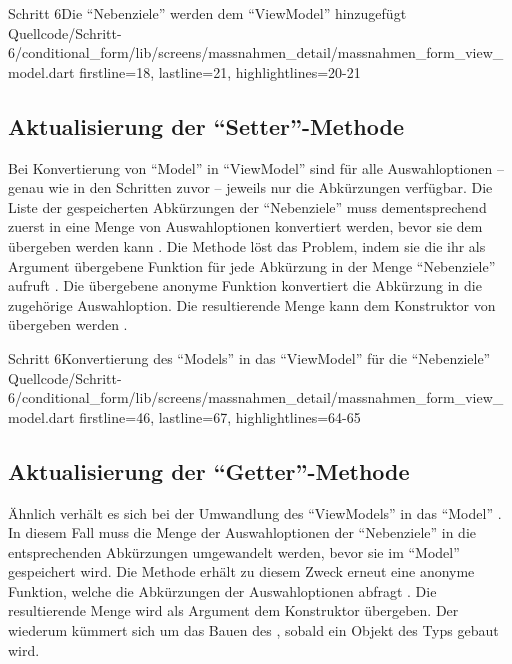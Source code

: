 \begin{alexlisting}{Schritt 6}{Die \enquote{Nebenziele} werden dem \enquote{ViewModel} hinzugefügt}
  {Quellcode/Schritt-6/conditional_form/lib/screens/massnahmen_detail/massnahmen_form_view_model.dart}
  {firstline=18, lastline=21, highlightlines={20-21}}
  \label{lst:Schritt6BehaviorSubjectNebenziele}
\end{alexlisting}

\subsection{Aktualisierung der \enquote{Setter}-Methode}


Bei Konvertierung von \enquote{Model} in \enquote{ViewModel} sind für alle Auswahloptionen -- genau wie in den Schritten zuvor -- jeweils nur die Abkürzungen verfügbar.
Die Liste der gespeicherten Abkürzungen der \enquote{Nebenziele} muss dementsprechend zuerst in eine Menge von Auswahloptionen konvertiert werden,
bevor sie dem  übergeben werden kann \Lst{\ref{lst:Schritt6setModel}}.
Die Methode  löst das Problem,
indem sie die ihr als Argument übergebene Funktion für jede Abkürzung in der Menge \enquote{Nebenziele} aufruft .
Die übergebene anonyme Funktion konvertiert die Abkürzung in die zugehörige Auswahloption.
Die resultierende Menge kann dem Konstruktor von  übergeben werden .

\begin{alexlisting}{Schritt 6}{Konvertierung des \enquote{Models} in das \enquote{ViewModel} für die \enquote{Nebenziele}}
  {Quellcode/Schritt-6/conditional_form/lib/screens/massnahmen_detail/massnahmen_form_view_model.dart}
  {firstline=46, lastline=67, highlightlines={64-65}}
  \label{lst:Schritt6setModel}
\end{alexlisting}

\clearpage
\subsection{Aktualisierung der \enquote{Getter}-Methode}

Ähnlich verhält es sich bei der Umwandlung des \enquote{ViewModels} in das \enquote{Model} \Lst{\ref{lst:Schritt6nebenzieleSetBuilder}}.
In diesem Fall muss die Menge der Auswahloptionen der \enquote{Nebenziele} in die entsprechenden Abkürzungen umgewandelt werden,
bevor sie im \enquote{Model} gespeichert wird.
Die Methode  erhält zu diesem Zweck erneut eine anonyme Funktion,
welche die Abkürzungen der Auswahloptionen abfragt .
Die resultierende Menge wird als Argument dem Konstruktor  übergeben.
Der  wiederum kümmert sich um das Bauen des , sobald ein Objekt des Typs  gebaut wird.

